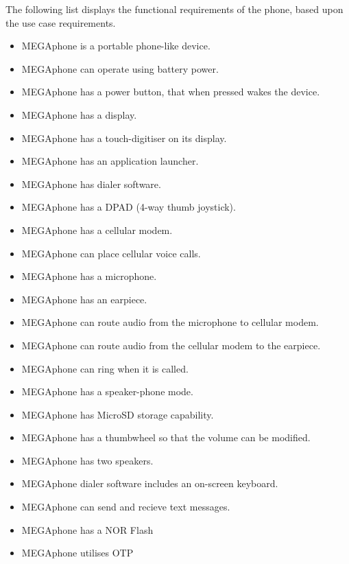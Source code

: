 	The following list displays the functional requirements of the phone, based upon the use case requirements.\\
	\begin{itemize}
        \item MEGAphone is a portable phone-like device.
        \item MEGAphone can operate using battery power.
        \item MEGAphone has a power button, that when pressed wakes the device.
        \item MEGAphone has a display.
        \item MEGAphone has a touch-digitiser on its display.
        \item MEGAphone has an application launcher.
        \item MEGAphone has dialer software.
        \item MEGAphone has a DPAD (4-way thumb joystick).
        \item MEGAphone has a cellular modem.
        \item MEGAphone can place cellular voice calls.
        \item MEGAphone has a microphone.
        \item MEGAphone has an earpiece.
        \item MEGAphone can route audio from the microphone to cellular modem.
        \item MEGAphone can route audio from the cellular modem to the earpiece.
        \item MEGAphone can ring when it is called.
        \item MEGAphone has a speaker-phone mode.
	\item MEGAphone has MicroSD storage capability.
	\item MEGAphone has a thumbwheel so that the volume can be modified.
	\item MEGAphone has two speakers.
	\item MEGAphone dialer software includes an on-screen keyboard.
	\item MEGAphone can send and recieve text messages.
	\item MEGAphone has a NOR Flash
	\item MEGAphone utilises OTP
	\end{itemize}
